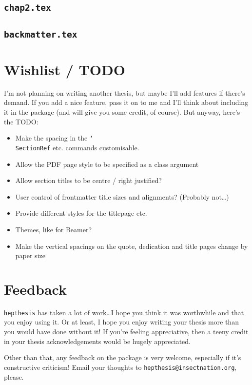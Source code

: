 \documentclass[12pt]{scrartcl}
\newcommand{\hepthesis}{\texttt{hepthesis}\xspace}
\newcommand{\texcmd}[1]{\texorpdfstring{\texttt{\char`\\#1}}{#1}}
\begin{document}
\subsection{\texttt{chap2.tex}}
{\smaller {}}

\subsection{\texttt{backmatter.tex}}
{\smaller {}}


\section{Wishlist / TODO}
I'm not planning on writing another thesis, but maybe I'll add features if
there's demand. If you add a nice feature, pass it on to me and I'll think about
including it in the package (and will give you some credit, of course). But anyway,
here's the TODO:
%
\begin{itemize}
\item Make the spacing in the \texcmd{SectionRef} etc. commands customisable.
\item Allow the PDF page style to be specified as a class argument
\item Allow section titles to be centre / right justified?
\item User control of frontmatter title sizes and alignments? (Probably not\dots)
\item Provide different styles for the titlepage etc.
\item Themes, like for Beamer?
\item Make the vertical spacings on the quote, dedication and title pages change by paper size
\end{itemize}


\section{Feedback}
\hepthesis has taken a lot of work\dots I hope you think it was worthwhile and
that you enjoy using it. Or at least, I hope you enjoy writing your thesis more
than you would have done without it! If you're feeling appreciative, then a teeny
credit in your thesis acknowledgements would be hugely appreciated.

Other than that, any feedback on the package is very welcome, especially if it's
constructive criticism! Email your thoughts to
\texttt{hepthesis@insectnation.org}, please.
\end{document}
